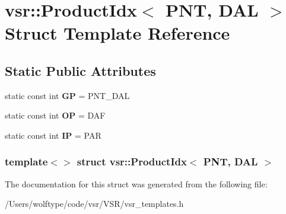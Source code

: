 \hypertarget{structvsr_1_1_product_idx_3_01_p_n_t_00_01_d_a_l_01_4}{\section{vsr\-:\-:Product\-Idx$<$ P\-N\-T, D\-A\-L $>$ Struct Template Reference}
\label{structvsr_1_1_product_idx_3_01_p_n_t_00_01_d_a_l_01_4}
}
\subsection*{Static Public Attributes}
\begin{DoxyCompactItemize}
\item 
\hypertarget{structvsr_1_1_product_idx_3_01_p_n_t_00_01_d_a_l_01_4_a637473f7849720b13f8889a2d4e4afcf}{static const int {\bfseries G\-P} = P\-N\-T\-\_\-\-D\-A\-L}\label{structvsr_1_1_product_idx_3_01_p_n_t_00_01_d_a_l_01_4_a637473f7849720b13f8889a2d4e4afcf}

\item 
\hypertarget{structvsr_1_1_product_idx_3_01_p_n_t_00_01_d_a_l_01_4_a8f5dfe282db5594355593fa605f0d9aa}{static const int {\bfseries O\-P} = D\-A\-F}\label{structvsr_1_1_product_idx_3_01_p_n_t_00_01_d_a_l_01_4_a8f5dfe282db5594355593fa605f0d9aa}

\item 
\hypertarget{structvsr_1_1_product_idx_3_01_p_n_t_00_01_d_a_l_01_4_a2dca4be7c0efceace4bdf3cfd5a4548a}{static const int {\bfseries I\-P} = P\-A\-R}\label{structvsr_1_1_product_idx_3_01_p_n_t_00_01_d_a_l_01_4_a2dca4be7c0efceace4bdf3cfd5a4548a}

\end{DoxyCompactItemize}
\subsubsection*{template$<$$>$ struct vsr\-::\-Product\-Idx$<$ P\-N\-T, D\-A\-L $>$}



The documentation for this struct was generated from the following file\-:\begin{DoxyCompactItemize}
\item 
/\-Users/wolftype/code/vsr/\-V\-S\-R/vsr\-\_\-templates.\-h\end{DoxyCompactItemize}
